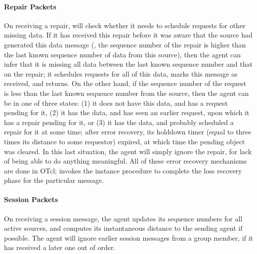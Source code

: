 {\paragraph{Repair Packets}
On receiving a repair, 
will check whether it needs to schedule requests for other missing data.
If it has received this repair
before it was aware that the source had generated this data message
(\ie, the sequence number of the repair is higher than 
the last known sequence number of data from this source),
then the agent can infer that it is missing all
data between the last known sequence number and that on the repair;
it schedules requests for all of this data,
 marks this message as received, and returns.
On the other hand, if the sequence number of the request is less
than the last known sequence number from the source,
then the agent can be in one of three states:
(1) it does not have this data, and has a request pending for it,
(2) it has the data, and has seen an earlier request,
    upon which it has a repair pending for it, or
(3) it has the data, and probably scheduled a repair for it at some time;
    after error recovery, its holddown timer (equal to three times its
    distance to some requestor) expired, at which time the pending object
    was cleared.  In this last situation, the agent will simply ignore
    the repair, for lack of being able to do anything meaningful.
All of these error recovery mechanisms are done in OTcl;
 invokes the instance procedure
to complete the loss recovery phase for the particular message.
  
\paragraph{Session Packets}
On receiving a session message,
the agent updates its sequence numbers for all active sources,
and computes its instantaneous distance to the sending agent if possible.
The agent will ignore earlier session messages from a group member,
if it has received a later one out of order.
  
}
